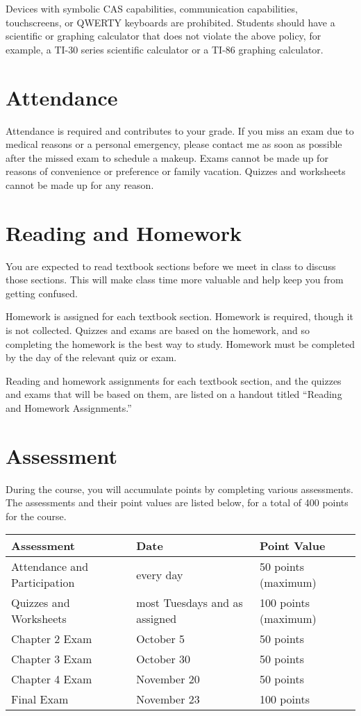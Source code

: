 \documentclass[10pt, letterpaper]{letter}
\begin{document}
Devices with symbolic CAS capabilities, communication capabilities,
touchscreens, or QWERTY keyboards are prohibited. Students should have a
scientific or graphing calculator that does not violate the above
policy, for example, a TI-30 series scientific calculator or a TI-86
graphing calculator.

\section{Attendance}

Attendance is required and contributes to your grade. If you miss an
exam due to medical reasons or a personal emergency, please contact me
as soon as possible after the missed exam to schedule a makeup. Exams
cannot be made up for reasons of convenience or preference or family
vacation. Quizzes and worksheets cannot be made up for any reason.

\section{Reading and Homework}

You are expected to read textbook sections before we meet in class to
discuss those sections. This will make class time more valuable and
help keep you from getting confused.

Homework is assigned for each textbook section. Homework is required,
though it is not collected. Quizzes and exams are based on the homework,
and so completing the homework is the best way to study. Homework must
be completed by the day of the relevant quiz or exam.

Reading and homework assignments for each textbook section, and the
quizzes and exams that will be based on them, are listed on a handout
titled ``Reading and Homework Assignments.''

\newpage

\section{Assessment}

During the course, you will accumulate points by completing various
assessments. The assessments and their point values are listed below,
for a total of 400 points for the course.

\begin{tabular}{l|l|l}
    \textbf{Assessment} & \textbf{Date} & \textbf{Point Value} \\
    \hline
    Attendance and Participation
        & every day & 50 points (maximum) \\
    Quizzes and Worksheets
        & most Tuesdays and as assigned & 100 points (maximum) \\
    Chapter 2 Exam & October 5   &  50 points \\
    Chapter 3 Exam & October 30  &  50 points \\
    Chapter 4 Exam & November 20 &  50 points \\
    Final Exam     & November 23 & 100 points \\
\end{tabular}
\end{document}
